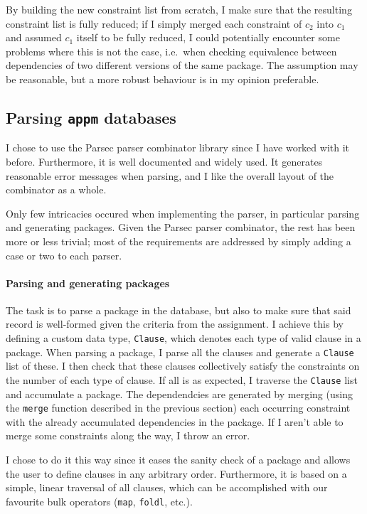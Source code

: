  By building the new constraint list from scratch, I make sure that the resulting constraint list is fully reduced; if I simply merged each constraint of $c_2$ into $c_1$ and assumed $c_1$ itself to be fully reduced, I could potentially encounter some problems where this is not the case, i.e.\ when checking equivalence between dependencies of two different versions of the same package. The assumption may be reasonable, but a more robust behaviour is in my opinion preferable.

\subsection*{Parsing \texttt{appm} databases}
I chose to use the Parsec parser combinator library since I have worked with it before. Furthermore, it is well documented and widely used. It generates reasonable error messages when parsing, and I like the overall layout of the combinator as a whole.

Only few intricacies occured when implementing the parser, in particular parsing and generating packages. Given the Parsec parser combinator, the rest has been more or less trivial; most of the requirements are addressed by simply adding a case or two to each parser.

\paragraph{Parsing and generating packages} The task is to parse a package in the database, but also to make sure that said record is well-formed given the criteria from the assignment. I achieve this by defining a custom data type, \texttt{Clause}, which denotes each type of valid clause in a package. When parsing a package, I parse all the clauses and generate a \texttt{Clause} list of these. I then check that these clauses collectively satisfy the constraints on the number of each type of clause. If all is as expected, I traverse the \texttt{Clause} list and accumulate a package. The dependendcies are generated by merging (using the \texttt{merge} function described in the previous section) each occurring constraint with the already accumulated dependencies in the package. If I aren't able to merge some constraints along the way, I throw an error.

I chose to do it this way since it eases the sanity check of a package and allows the user to define clauses in any arbitrary order. Furthermore, it is based on a simple, linear traversal of all clauses, which can be accomplished with our favourite bulk operators (\texttt{map}, \texttt{foldl}, etc.).

